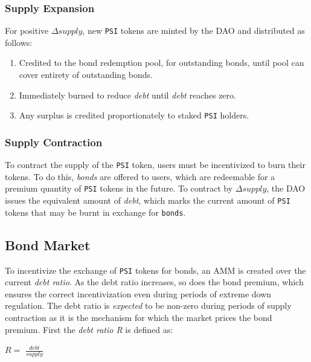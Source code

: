 \documentclass[a4paper, 12pt]{article}
\begin{document}
	\newpage

	\subsubsection{Supply Expansion}
	For positive $\Delta supply$, new \texttt{PSI} tokens are minted by the DAO and distributed as follows:
	
	\begin{enumerate}

		\item{Credited to the bond redemption pool, for outstanding bonds, until pool can cover entirety of outstanding bonds.}
		\item{Immediately burned to reduce \textit{debt} until \textit{debt} reaches zero.}
		\item{Any surplus is credited proportionately to staked \texttt{PSI} holders.}

	\end{enumerate}

	\subsubsection{Supply Contraction}
	To contract the supply of the \texttt{PSI} token, users must be incentivized to burn their tokens. To do this, \textit{bonds} are offered to users, which are redeemable for a premium quantity of 				\texttt{PSI} tokens in the future.
	To contract by $\Delta supply$, the DAO issues the equivalent amount of \textit{debt}, which marks the current amount of \texttt{PSI} tokens that may be burnt in exchange for \texttt{bonds}.

	\subsection{Bond Market}
	To incentivize the exchange of \texttt{PSI} tokens for bonds, an AMM is created over the current \textit{debt ratio}. As the debt ratio increases, so does the bond premium, which ensures the correct 			incentivization even during periods of extreme down regulation.
	The debt ratio is \textit{expected} to be non-zero during periods of supply contraction as it is the mechanism for which the market prices the bond premium.
	First the \textit{debt ratio R} is defined as:

	\begin{center}

		$R = $ \Large{$\frac{debt}{supply}$}

	\end{center}
\end{document}

